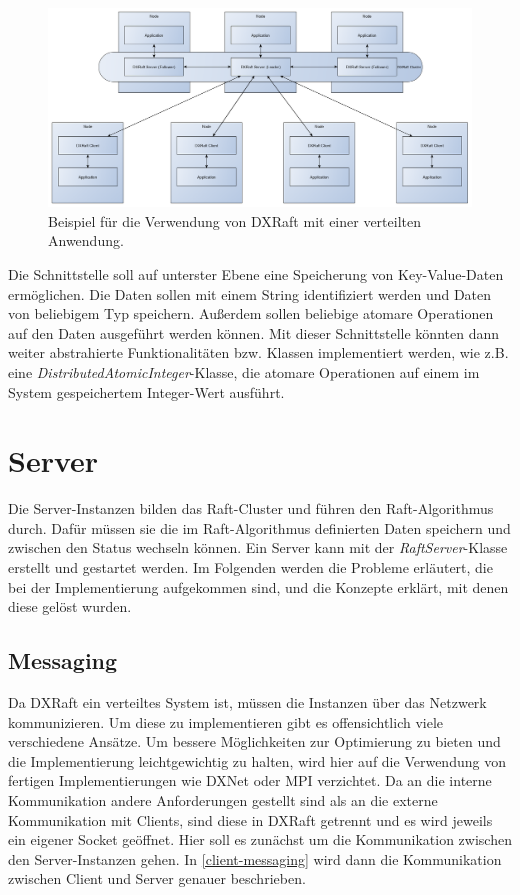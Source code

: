 \begin{figure}[h]
	\centering
	\includegraphics[width=\linewidth]{img/components.png}
	\caption{Beispiel für die Verwendung von DXRaft mit einer verteilten Anwendung.}
	\label{fig:components}
\end{figure}

Die Schnittstelle soll auf unterster Ebene eine Speicherung von Key-Value-Daten ermöglichen. Die Daten sollen mit einem String identifiziert werden und Daten von beliebigem Typ speichern. Außerdem sollen beliebige atomare Operationen auf den Daten ausgeführt werden können. Mit dieser Schnittstelle könnten dann weiter abstrahierte Funktionalitäten bzw. Klassen implementiert werden, wie z.B. eine \textit{DistributedAtomicInteger}-Klasse, die atomare Operationen auf einem im System gespeichertem Integer-Wert ausführt.

\section{Server}

Die Server-Instanzen bilden das Raft-Cluster und führen den Raft-Algorithmus durch. Dafür müssen sie die im Raft-Algorithmus definierten Daten speichern und zwischen den Status wechseln können. Ein Server kann mit der \textit{RaftServer}-Klasse erstellt und gestartet werden. Im Folgenden werden die Probleme erläutert, die bei der Implementierung aufgekommen sind, und die Konzepte erklärt, mit denen diese gelöst wurden.

\subsection{Messaging}
\label{messaging}

Da DXRaft ein verteiltes System ist, müssen die Instanzen über das Netzwerk kommunizieren. Um diese zu implementieren gibt es offensichtlich viele verschiedene Ansätze. Um bessere Möglichkeiten zur Optimierung zu bieten und die Implementierung leichtgewichtig zu halten, wird hier auf die Verwendung von fertigen Implementierungen wie DXNet  \cite{dxnet} oder MPI \cite{mpi} verzichtet. Da an die interne Kommunikation andere Anforderungen gestellt sind als an die externe Kommunikation mit Clients, sind diese in DXRaft getrennt und es wird jeweils ein eigener Socket geöffnet. Hier soll es zunächst um die Kommunikation zwischen den Server-Instanzen gehen. In \ref{client-messaging} wird dann die Kommunikation zwischen Client und Server genauer beschrieben.

